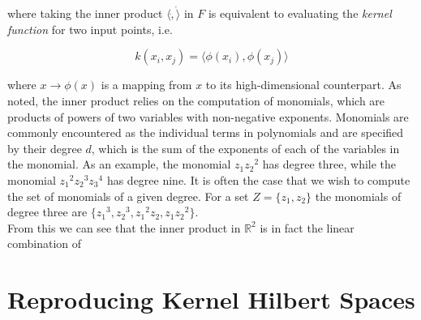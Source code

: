 \noindent where taking the inner product $\langle \dot, \dot \rangle$ in $F$ is equivalent to evaluating the \textit{kernel function} for two input points, i.e.

\begin{equation}
k(x_i, x_j) = \langle \phi(x_i), \phi(x_j) \rangle
\end{equation} 

\noindent where $x \rightarrow \phi(x)$ is a mapping from $x$ to its high-dimensional counterpart. As noted, the inner product relies on the computation of monomials, which are products of powers of two variables with non-negative exponents. Monomials are commonly encountered as the individual terms in polynomials and are specified by their degree $d$, which is the sum of the exponents of each of the variables in the monomial. As an example, the monomial $z_1{z_2}^2$ has degree three, while the monomial ${z_1}^2{z_2}^3{z_3}^4$ has degree nine. It is often the case that we wish to compute the set of monomials of a given degree. For a set $Z = \{z_1, z_2\}$ the monomials of degree three are $\{{z_1}^3, {z_2}^3, {z_1}^2{z_2}, {z_1}{z_2}^2\}$. \\

From this we can see that the inner product in $\mathbb{R}^2$ is in fact the linear combination of 

\section{Reproducing Kernel Hilbert Spaces}





